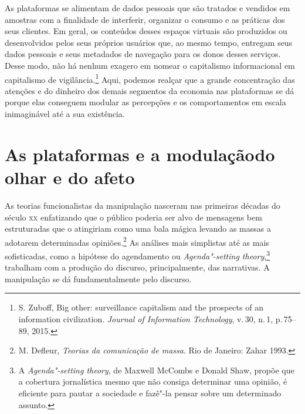 As plataformas se alimentam de dados pessoais que são tratados e
vendidos em amostras com a finalidade de interferir, organizar o consumo
e as práticas dos seus clientes. Em geral, os conteúdos desses espaços
virtuais são produzidos ou desenvolvidos pelos seus próprios usuários
que, ao mesmo tempo, entregam seus dados pessoais e seus metadados de
navegação para os donos desses serviços. Desse modo, não há nenhum
exagero em nomear o capitalismo informacional em capitalismo de
vigilância.\footnote{S. Zuboff, Big other: surveillance capitalism and the
prospects of an information civilization. \textit{Journal of Information
Technology}, v.\,30, n.\,1, p.\,75--89, 2015.} Aqui, podemos realçar que a grande
concentração das atenções e do dinheiro dos demais segmentos da economia
nas plataformas se dá porque elas conseguem modular as percepções e os
comportamentos em escala inimaginável até a sua existência.

\section{As plataformas e a modulação\break do olhar e do afeto}

As teorias funcionalistas da manipulação nasceram nas primeiras décadas
do século \textsc{xx} enfatizando que o público poderia ser alvo de mensagens bem
estruturadas que o atingiriam como uma bala mágica levando as massas a
adotarem determinadas opiniões.\footnote{M. Defleur, \textit{Teorias da comunicação de massa}. Rio de Janeiro: Zahar 1993.} As análises mais
simplistas até as mais sofisticadas, como a hipótese do agendamento ou
\textit{Agenda"-setting theory},\footnote{A \textit{Agenda"-setting theory}, de
  Maxwell McCombs e Donald Shaw, propõe que a cobertura jornalística
  mesmo que não consiga determinar uma opinião, é eficiente para pautar a
  sociedade e fazê"-la pensar sobre um determinado assunto.} trabalham com a produção do discurso, principalmente, das narrativas. A manipulação se dá
fundamentalmente pelo discurso.


